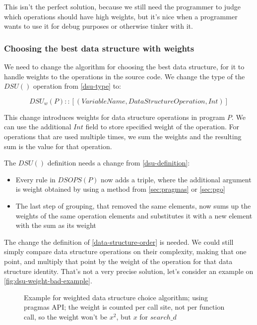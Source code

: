 \documentclass[a4paper,11pt]{article}
\begin{document}
			This isn't the perfect solution, because we still need the programmer to judge which operations
			should have high weights, but it's nice when a programmer wants to use it for debug purposes or
			otherwise tinker with it.

		\subsubsection{Choosing the best data structure with weights} \label{sec:choose-weights}

			We need to change the algorithm for choosing the best data structure, for it to handle weights
			to the operations in the source code. We change the type of the $DSU()$ operation from
			\autoref{dsu-type} to:

			\begin{equation}
				DSU_w(P) :: [(VariableName, DataStructureOperation, Int)]
			\end{equation}

			This change introduces weights for data structure operations in program $P$. We can use the
			additional $Int$ field to store specified weight of the operation.  For operations that are used
			multiple times, we sum the weights and the resulting sum is the value for that operation.

			The $DSU()$ definition needs a change from \autoref{dsu-definition}:

			\begin{itemize}
				\item Every rule in $DSOPS(P)$ now adds a triple, where the additional argument is
					weight obtained by using a method from \autoref{sec:pragmas} or
					\autoref{sec:pgo}

				\item The last step of grouping, that removed the same elements, now sums up the weights
					of the same operation elements and substitutes it with a new element with the
					sum as its weight
			\end{itemize}

            The change the definition of \autoref{data-structure-order} is needed. We could still simply compare data
            structure operations on their complexity, making that one point, and multiply that point by the weight of
            the operation for that data structure identity. That's not a very precise solution, let's consider an
            example on \autoref{fig:dsu-weight-bad-example}.

            \begin{figure}[!h]
                

                \caption{Example for weighted data structure choice algorithm; using pragmas API; the weight is
                counted per call site, not per function call, so the weight won't be $x^2$, but $x$ for $search\_d$ }

                \label{fig:dsu-weight-bad-example}
            \end{figure}
\end{document}
